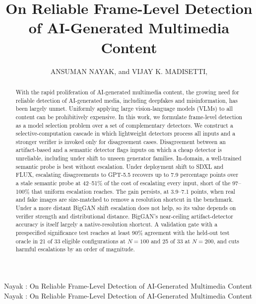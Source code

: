 \documentclass{ieeeaccess}
\begin{document}

\title{On Reliable Frame-Level Detection of AI-Generated Multimedia Content}
\author{\uppercase{Ansuman Nayak}, and 
\uppercase{Vijay K. Madisetti}, }

\address[1]{College of Computing, Georgia Institute of Technology, Atlanta, GA 30332 USA (e-mail: anayak306@gatech.edu)}
\address[2]{School of Cybersecurity and Privacy, Georgia Institute of Technology, Atlanta, GA 30332 USA (e-mail: vkm@gatech.edu)}

\markboth
{Nayak \headeretal: On Reliable Frame-Level Detection of AI-Generated Multimedia Content}
{Nayak \headeretal: On Reliable Frame-Level Detection of AI-Generated Multimedia Content}


\begin{abstract}
With the rapid proliferation of AI-generated multimedia content, the growing need for reliable detection of AI-generated media, including deepfakes and misinformation, has been largely unmet. Uniformly applying large vision-language models (VLMs) to all content can be prohibitively expensive. In this work, we formulate frame-level detection as a model selection problem over a set of complementary detectors. We construct a selective-computation cascade in which lightweight detectors process all inputs and a stronger verifier is invoked only for disagreement cases. Disagreement between an artifact-based and a semantic detector flags inputs on which a cheap detector is unreliable, including under shift to unseen generator families. In-domain, a well-trained semantic probe is best without escalation. Under deployment shift to SDXL and FLUX, escalating disagreements to GPT-5.5 recovers up to 7.9 percentage points over a stale semantic probe at 42--51\% of the cost of escalating every input, short of the 97--100\% that uniform escalation reaches. The gain persists, at 3.9--7.1 points, when real and fake images are size-matched to remove a resolution shortcut in the benchmark. Under a more distant BigGAN shift escalation does not help, so its value depends on verifier strength and distributional distance. BigGAN's near-ceiling artifact-detector accuracy is itself largely a native-resolution shortcut. A validation gate with a prespecified significance test reaches at least 90\% agreement with the held-out test oracle in 21 of 33 eligible configurations at $N=100$ and 25 of 33 at $N=200$, and cuts harmful escalations by an order of magnitude.

\end{abstract}
\end{document}

